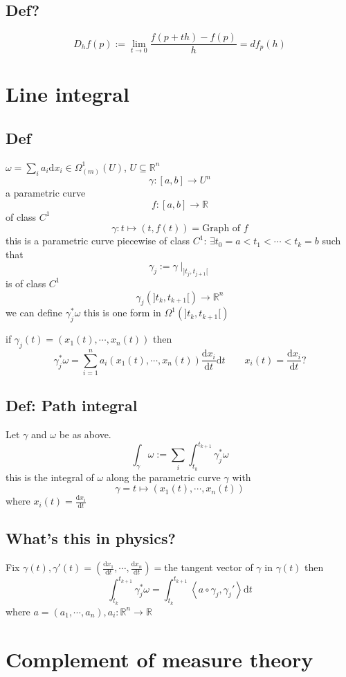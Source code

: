 \documentclass{book}
\newcommand{\leftbracket}{[}
\newcommand{\rightbracket}{]}
\begin{document}
\section{Def?}
$$D_hf(p):=\lim\limits_{t\rightarrow 0}\frac{f(p+th)-f(p)}{h}=df_p(h)$$
\chapter{Line integral}
\section{Def}
$\omega=\sum\limits_{i}a_i\text{d}x_i\in \Omega^1_(m)(U)$, $U\subseteq\mathbb{R}^n$
$$\gamma:[a,b]\rightarrow U^n$$a parametric curve
$$f:[a,b]\rightarrow\mathbb{R}$$ of class $C^1$$$\gamma:t\mapsto(t,f(t))=\text{Graph of }f$$
this is a parametric curve
piecewise of class $C^1$: $\exists t_0=a<t_1<\cdots<t_k=b$ such that $$\gamma_j:=\gamma\mid_{\rightbracket t_j,t_{j+1} \leftbracket}$$
is of class $C^1$
$$\gamma_j(\rightbracket t_k,t_{k+1}\leftbracket)\rightarrow\mathbb{R}^n$$
we can define $\gamma^*_j\omega$ this is one form in $\Omega^1(\rightbracket t_k,t_{k+1}\leftbracket)$

if $\gamma_j(t)=(x_1(t),\cdots,x_n(t))$ then $$\gamma_j^*\omega=\sum\limits_{i=1}^na_i(x_1(t),\cdots,x_n(t))\frac{\text{d}x_i}{\text{d}t}\text{d}t\qquad x_i(t)=\frac{\text{d}x_i}{\text{d}t}?$$
\section{Def: Path integral}
\label{Def 52.2}
Let $\gamma$ and $\omega$ be as above.
$$\int_\gamma\omega:=\sum\limits_i\int_{t_k}^{t_{k+1}}\gamma_j^*\omega$$
this is the integral of $\omega$ along the parametric curve $\gamma$ with
$$\gamma=t\mapsto(x_1(t),\cdots,x_n(t))$$
where $x_i(t)=\frac{\text{d}x_i}{\text{d}t}$
\section{What's this in physics?}
Fix $\gamma(t),\gamma'(t)=(\frac{\text{d}x_1}{\text{d}t},\cdots,\frac{\text{d}x_n}{\text{d}t})=$the tangent vector of $\gamma$ in $\gamma(t)$ then
$$\int_{t_k}^{t_{k+1}}\gamma^*_j\omega=\int_{t_k}^{t_{k+1}}\left<a\circ\gamma_j,\gamma_j'\right>\text{d}t$$ where $a=(a_1,\cdots,a_n), a_i:\mathbb{R}^n\rightarrow\mathbb{R}$
\chapter{Complement of measure theory}
\end{document}
